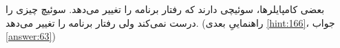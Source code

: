 \section{}
\paragraph{}\label{hint:278}
بعضی کامپایلرها، سوئیچی دارند که رفتار برنامه را تغییر می‌دهد. سوئیچ چیزی را درست نمی‌کند ولی رفتار برنامه را تغییر می‌دهد. (راهنماییِ بعدی \ref{hint:166}، جواب \ref{answer:63})